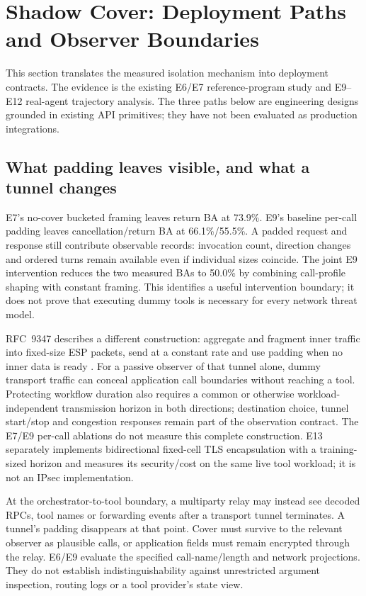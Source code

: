 \section{Shadow Cover: Deployment Paths and Observer Boundaries}\label{sec:shadow-deployment}
This section translates the measured isolation mechanism into deployment contracts. The evidence is the existing E6/E7 reference-program study and E9--E12 real-agent trajectory analysis. The three paths below are engineering designs grounded in existing API primitives; they have not been evaluated as production integrations.



\subsection{What padding leaves visible, and what a tunnel changes}
E7's no-cover bucketed framing leaves return BA at 73.9\%. E9's baseline per-call padding leaves cancellation/return BA at 66.1\%/55.5\%. A padded request and response still contribute observable records: invocation count, direction changes and ordered turns remain available even if individual sizes coincide. The joint E9 intervention reduces the two measured BAs to 50.0\% by combining call-profile shaping with constant framing. This identifies a useful intervention boundary; it does not prove that executing dummy tools is necessary for every network threat model.

RFC~9347 describes a different construction: aggregate and fragment inner traffic into fixed-size ESP packets, send at a constant rate and use padding when no inner data is ready \cite{rfc9347}. For a passive observer of that tunnel alone, dummy transport traffic can conceal application call boundaries without reaching a tool. Protecting workflow duration also requires a common or otherwise workload-independent transmission horizon in both directions; destination choice, tunnel start/stop and congestion responses remain part of the observation contract. The E7/E9 per-call ablations do not measure this complete construction. E13 separately implements bidirectional fixed-cell TLS encapsulation with a training-sized horizon and measures its security/cost on the same live tool workload; it is not an IPsec implementation.

At the orchestrator-to-tool boundary, a multiparty relay may instead see decoded RPCs, tool names or forwarding events after a transport tunnel terminates. A tunnel's padding disappears at that point. Cover must survive to the relevant observer as plausible calls, or application fields must remain encrypted through the relay. E6/E9 evaluate the specified call-name/length and network projections. They do not establish indistinguishability against unrestricted argument inspection, routing logs or a tool provider's state view.

